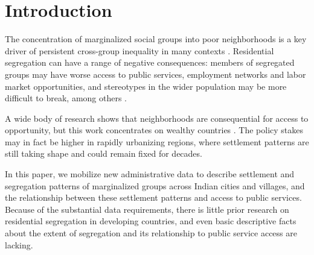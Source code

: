 \documentclass[12pt]{article}
\begin{document}
\begin{titlepage}
\begin{abstract}
    \vspace{0in}
    \noindent\textbf{JEL Codes:} H41, J15, O15 \\

    \bigskip
  \end{abstract}
  \setcounter{page}{0}
  \thispagestyle{empty}
\end{titlepage}
\clearpage

\doublespacing

\section{Introduction} \label{sec:introduction}

The concentration of marginalized social groups into poor neighborhoods is a key driver of persistent cross-group inequality in many contexts \citep{Cutler2008,Ananat2009,alesina2011,Boustan2011,chyn2022}. Residential segregation can have a range of negative consequences: members of segregated groups may have worse access to public services, employment networks and labor market opportunities, and stereotypes in the wider population may be more difficult to break, among others \citep{massey1993,cutler1997}.

A wide body of research shows that neighborhoods are consequential for access to opportunity, but this work concentrates on wealthy countries \cite{chetty2016theeffects,hendren2016,fogli2025}. The policy stakes may in fact be higher in rapidly urbanizing regions, where settlement patterns are still taking shape and could remain fixed for decades.

In this paper, we mobilize new administrative data to describe settlement and segregation patterns of marginalized groups across Indian cities and villages, and the relationship between these settlement patterns and access to public services. Because of the substantial data requirements, there is little prior research on residential segregation in developing countries, and even basic descriptive facts about the extent of segregation and its relationship to public service access are lacking.
\end{document}
